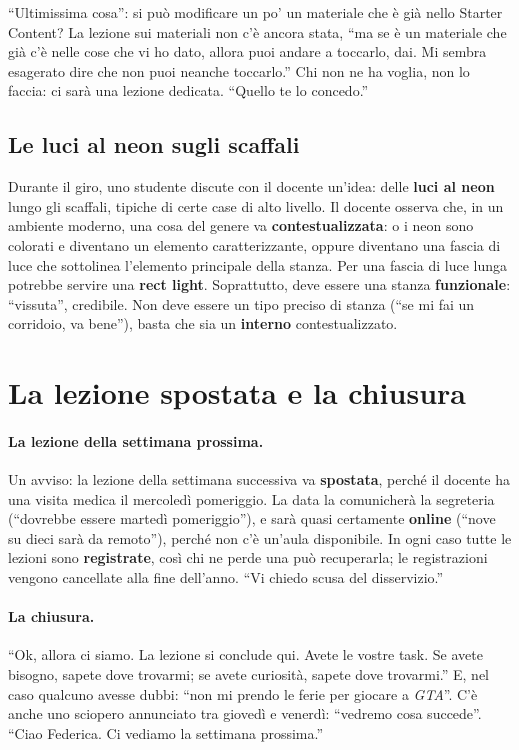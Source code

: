 ``Ultimissima cosa'': si può modificare un po' un materiale che è già nello Starter
Content? La lezione sui materiali non c'è ancora stata, ``ma se è un materiale che
già c'è nelle cose che vi ho dato, allora puoi andare a toccarlo, dai. Mi sembra
esagerato dire che non puoi neanche toccarlo.'' Chi non ne ha voglia, non lo faccia:
ci sarà una lezione dedicata. ``Quello te lo concedo.''

\subsection{Le luci al neon sugli scaffali}

Durante il giro, uno studente discute con il docente un'idea: delle \textbf{luci al
neon} lungo gli scaffali, tipiche di certe case di alto livello. Il docente osserva
che, in un ambiente moderno, una cosa del genere va \textbf{contestualizzata}: o i
neon sono colorati e diventano un elemento caratterizzante, oppure diventano una
fascia di luce che sottolinea l'elemento principale della stanza. Per una fascia di
luce lunga potrebbe servire una \textbf{rect light}. Soprattutto, deve essere una
stanza \textbf{funzionale}: ``vissuta'', credibile. Non deve essere un tipo preciso
di stanza (``se mi fai un corridoio, va bene''), basta che sia un
\textbf{interno} contestualizzato.

\section{La lezione spostata e la chiusura}
\label{gd14:sec:chiusura}

\paragraph{La lezione della settimana prossima.} Un avviso: la lezione della
settimana successiva va \textbf{spostata}, perché il docente ha una visita medica il
mercoledì pomeriggio. La data la comunicherà la segreteria (``dovrebbe essere
martedì pomeriggio''), e sarà quasi certamente \textbf{online} (``nove su dieci sarà
da remoto''), perché non c'è un'aula disponibile. In ogni caso tutte le lezioni sono
\textbf{registrate}, così chi ne perde una può recuperarla; le registrazioni vengono
cancellate alla fine dell'anno. ``Vi chiedo scusa del disservizio.''

\paragraph{La chiusura.} ``Ok, allora ci siamo. La lezione si conclude qui. Avete le
vostre task. Se avete bisogno, sapete dove trovarmi; se avete curiosità, sapete dove
trovarmi.'' E, nel caso qualcuno avesse dubbi: ``non mi prendo le ferie per giocare a
\emph{GTA}''. C'è anche uno sciopero annunciato tra giovedì e venerdì: ``vedremo cosa
succede''. ``Ciao Federica. Ci vediamo la settimana prossima.''

